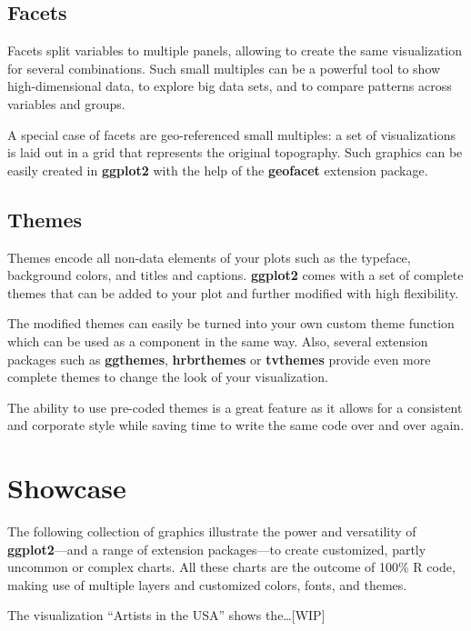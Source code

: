 \documentclass[
]{krantz}
\begin{document}
\hypertarget{facets}{%
\subsection{Facets}\label{facets}}

Facets split variables to multiple panels, allowing to create the same visualization for several combinations. Such small multiples can be a powerful tool to show high-dimensional data, to explore big data sets, and to compare patterns across variables and groups.

A special case of facets are geo-referenced small multiples: a set of visualizations is laid out in a grid that represents the original topography. Such graphics can be easily created in \textbf{ggplot2} with the help of the \textbf{geofacet} extension package.

\hypertarget{themes}{%
\subsection{Themes}\label{themes}}

Themes encode all non-data elements of your plots such as the typeface, background colors, and titles and captions. \textbf{ggplot2} comes with a set of complete themes that can be added to your plot and further modified with high flexibility.

The modified themes can easily be turned into your own custom theme function which can be used as a component in the same way. Also, several extension packages such as \textbf{ggthemes}, \textbf{hrbrthemes} or \textbf{tvthemes} provide even more complete themes to change the look of your visualization.

The ability to use pre-coded themes is a great feature as it allows for a consistent and corporate style while saving time to write the same code over and over again.

\hypertarget{showcase}{%
\section{Showcase}\label{showcase}}

The following collection of graphics illustrate the power and versatility of \textbf{ggplot2}---and a range of extension packages---to create customized, partly uncommon or complex charts. All these charts are the outcome of 100\% R code, making use of multiple layers and customized colors, fonts, and themes.

The visualization ``Artists in the USA'' shows the\ldots{[}WIP{]}
\end{document}
